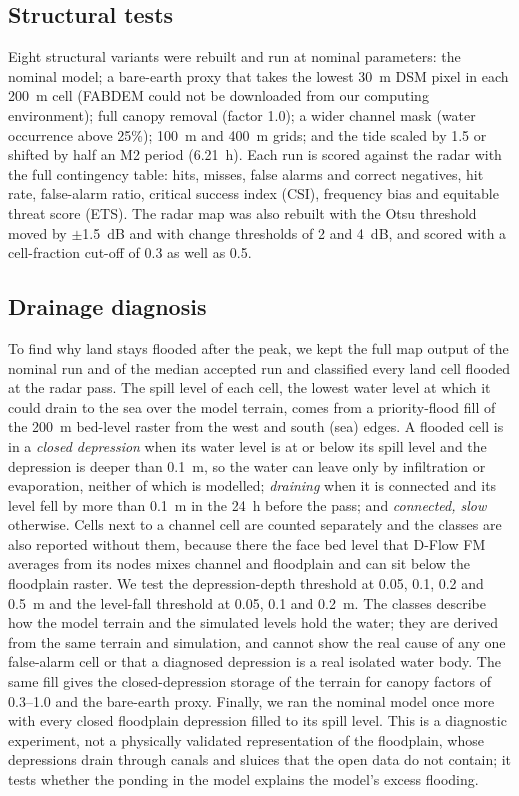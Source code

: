 \documentclass[preprint,12pt,authoryear]{elsarticle}
\begin{document}
\subsection{Structural tests}
Eight structural variants were rebuilt and run at nominal parameters: the nominal model; a bare-earth proxy that takes the lowest 30~m DSM pixel in each 200~m cell (FABDEM could not be downloaded from our computing environment); full canopy removal (factor 1.0); a wider channel mask (water occurrence above 25\%); 100~m and 400~m grids; and the tide scaled by 1.5 or shifted by half an M2 period (6.21~h). Each run is scored against the radar with the full contingency table: hits, misses, false alarms and correct negatives, hit rate, false-alarm ratio, critical success index (CSI), frequency bias and equitable threat score (ETS). The radar map was also rebuilt with the Otsu threshold moved by $\pm$1.5~dB and with change thresholds of 2 and 4~dB, and scored with a cell-fraction cut-off of 0.3 as well as 0.5.

\subsection{Drainage diagnosis}
\label{sec:drainagemethod}
To find why land stays flooded after the peak, we kept the full map output of the nominal run and of the median accepted run and classified every land cell flooded at the radar pass. The spill level of each cell, the lowest water level at which it could drain to the sea over the model terrain, comes from a priority-flood fill of the 200~m bed-level raster from the west and south (sea) edges. A flooded cell is in a \emph{closed depression} when its water level is at or below its spill level and the depression is deeper than 0.1~m, so the water can leave only by infiltration or evaporation, neither of which is modelled; \emph{draining} when it is connected and its level fell by more than 0.1~m in the 24~h before the pass; and \emph{connected, slow} otherwise. Cells next to a channel cell are counted separately and the classes are also reported without them, because there the face bed level that D-Flow FM averages from its nodes mixes channel and floodplain and can sit below the floodplain raster. We test the depression-depth threshold at 0.05, 0.1, 0.2 and 0.5~m and the level-fall threshold at 0.05, 0.1 and 0.2~m. The classes describe how the model terrain and the simulated levels hold the water; they are derived from the same terrain and simulation, and cannot show the real cause of any one false-alarm cell or that a diagnosed depression is a real isolated water body. The same fill gives the closed-depression storage of the terrain for canopy factors of 0.3--1.0 and the bare-earth proxy. Finally, we ran the nominal model once more with every closed floodplain depression filled to its spill level. This is a diagnostic experiment, not a physically validated representation of the floodplain, whose depressions drain through canals and sluices that the open data do not contain; it tests whether the ponding in the model explains the model's excess flooding.
\end{document}
